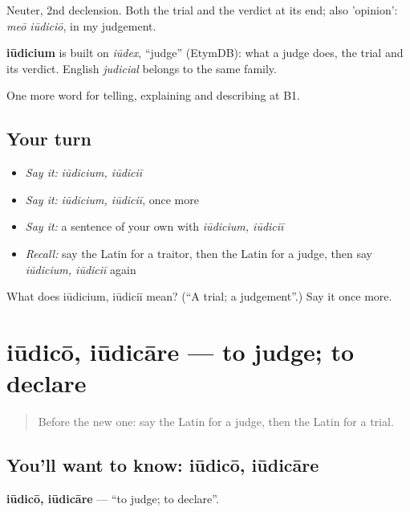 Neuter, 2nd declension. Both the trial and the verdict at its end; also 'opinion': \emph{meō iūdiciō}, in my judgement.

\begin{cousinweb}
\textbf{iūdicium} is built on \emph{iūdex}, \textquotedblleft{}judge\textquotedblright{} (EtymDB): what a judge does, the trial and its verdict. English \emph{judicial} belongs to the same family.
\end{cousinweb}

\begin{grammarlens}[title={What you've built}]
One more word for telling, explaining and describing at B1.
\end{grammarlens}

\subsection*{Your turn}
\begin{itemize}
\raggedright
  \item \emph{Say it:} \emph{iūdicium, iūdiciī}
  \item \emph{Say it:} \emph{iūdicium, iūdiciī}, once more
  \item \emph{Say it:} a sentence of your own with \emph{iūdicium, iūdiciī}
  \item \emph{Recall:} say the Latin for a traitor, then the Latin for a judge, then say \emph{iūdicium, iūdiciī} again
\end{itemize}

\begin{tcolorbox}[breakable,colback=teal!4,colframe=teal!35!black,title={Before you move on}]
What does iūdicium, iūdiciī mean? (\textquotedblleft{}A trial; a judgement\textquotedblright{}.) Say it once more.
\end{tcolorbox}
\section[iūdicō, iūdicāre]{iūdicō, iūdicāre — to judge; to declare}

\label{lesson:LA-C308-iudico}



\begin{quote}
Before the new one: say the Latin for a judge, then the Latin for a trial.
\end{quote}

\subsection*{You'll want to know: iūdicō, iūdicāre}
\textbf{iūdicō, iūdicāre} — \textquotedblleft{}to judge; to declare\textquotedblright{}.

